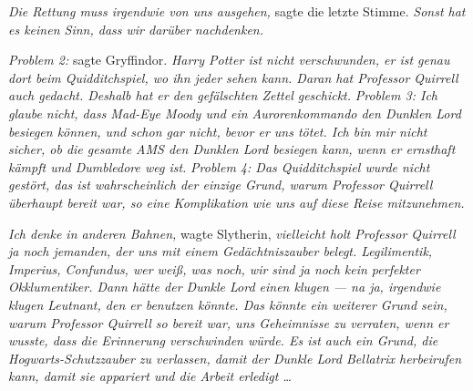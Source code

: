 \emph{Die Rettung muss irgendwie von uns ausgehen,} sagte die letzte Stimme. \emph{Sonst hat es keinen Sinn, dass wir darüber nachdenken.}

\emph{Problem 2:} sagte Gryffindor. \emph{Harry Potter ist nicht verschwunden, er ist genau dort beim Quidditchspiel, wo ihn jeder sehen kann. Daran hat Professor Quirrell auch gedacht. Deshalb hat er den gefälschten Zettel geschickt.}
\emph{Problem 3: Ich glaube nicht, dass Mad-Eye Moody und ein Aurorenkommando den Dunklen Lord besiegen können, und schon gar nicht, bevor er uns tötet. Ich bin mir nicht sicher, ob die gesamte AMS den Dunklen Lord besiegen kann, wenn er ernsthaft kämpft und Dumbledore weg ist.}
\emph{Problem 4: Das Quidditchspiel wurde nicht gestört, das ist wahrscheinlich der einzige Grund, warum Professor Quirrell überhaupt bereit war, so eine Komplikation wie uns auf diese Reise mitzunehmen.}

\emph{Ich denke in anderen Bahnen,} wagte Slytherin, \emph{vielleicht holt Professor Quirrell ja noch jemanden, der uns mit einem Gedächtniszauber belegt. Legilimentik, Imperius, Confundus, wer weiß, was noch, wir sind ja noch kein perfekter Okklumentiker. Dann hätte der Dunkle Lord einen klugen — na ja, irgendwie klugen Leutnant, den er benutzen könnte. Das könnte ein weiterer Grund sein, warum Professor Quirrell so bereit war, uns Geheimnisse zu verraten, wenn er wusste, dass die Erinnerung verschwinden würde. Es ist auch ein Grund, die Hogwarts-Schutzzauber zu verlassen, damit der Dunkle Lord Bellatrix herbeirufen kann, damit sie appariert und die Arbeit erledigt …}

